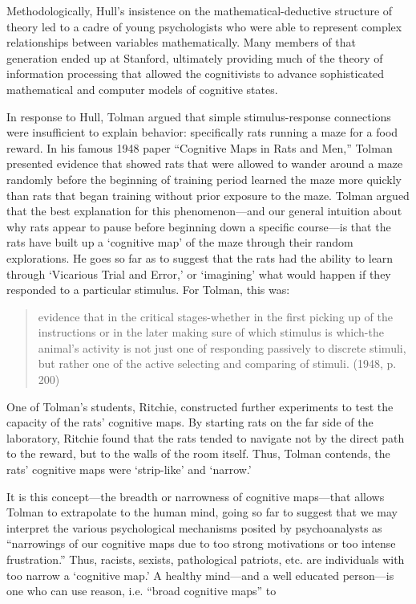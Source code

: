 Methodologically, Hull's insistence on the mathematical-deductive structure of theory led to a cadre of young psychologists who were able to represent complex relationships between variables mathematically. Many members of that generation ended up at Stanford, ultimately providing much of the theory of information processing that allowed the cognitivists to advance sophisticated mathematical and computer models of cognitive states.

In response to Hull, Tolman argued that simple stimulus-response connections were insufficient to explain behavior: specifically rats running a maze for a food reward. In his famous 1948 paper “Cognitive Maps in Rats and Men,” Tolman presented evidence that showed rats that were allowed to wander around a maze randomly before the beginning of training period learned the maze more quickly than rats that began training without prior exposure to the maze. Tolman argued that the best explanation for this phenomenon---and our general intuition about why rats appear to pause before beginning down a specific course---is that the rats have built up a `cognitive map' of the maze through their random explorations. He goes so far as to suggest that the rats had the ability to learn through `Vicarious Trial and Error,' or `imagining' what would happen if they responded to a particular stimulus. For Tolman, this was:

\begin{quote}

evidence that in the critical stages-whether in the first picking up of the instructions or in the later making sure of which stimulus is which-the animal's activity is not just one of responding passively to discrete stimuli, but rather one of the active selecting and comparing of stimuli. (1948, p. 200)
\end{quote}

One of Tolman's students, Ritchie, constructed further experiments to test the capacity of the rats' cognitive maps. By starting rats on the far side of the laboratory, Ritchie found that the rats tended to navigate not by the direct path to the reward, but to the walls of the room itself. Thus, Tolman contends, the rats' cognitive maps were `strip-like' and `narrow.'

It is this concept—the breadth or narrowness of cognitive maps—that allows Tolman to extrapolate to the human mind, going so far to suggest that we may interpret the various psychological mechanisms posited by psychoanalysts as “narrowings of our cognitive maps due to too strong motivations or too intense frustration.” Thus, racists, sexists, pathological patriots, etc. are individuals with too narrow a `cognitive map.' A healthy mind---and a well educated person---is one who can use reason, i.e. “broad cognitive maps” to


